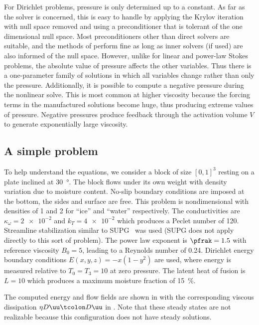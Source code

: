 For Dirichlet problems, pressure is only determined up to a constant.
As far as the solver is concerned, this is easy to handle by applying the Krylov iteration with null space removed and using a preconditioner that is tolerant of the one dimensional null space.
Most preconditioners other than direct solvers are suitable, and the methods of  perform fine as long as inner solvers (if used) are also informed of the null space.
However, unlike for linear and power-law Stokes problems, the absolute value of pressure affects the other variables.
Thus there is a one-parameter family of solutions in which all variables change rather than only the pressure.
Additionally, it is possible to compute a negative pressure during the nonlinear solve.
This is most common at higher viscosity because the forcing terms in the manufactured solutions become huge, thus producing extreme values of pressure.
Negative pressures produce feedback through the activation volume $V$ to generate exponentially large viscosity.

\subsection{A simple problem}\label{sec:vhtsimple}
To help understand the equations, we consider a block of size $[0,1]^3$ resting on a plate inclined at \SI{30}{\degree}.
The block flows under its own weight with density variation due to moisture content.
No-slip boundary conditions are imposed at the bottom, the sides and surface are free.
This problem is nondimensional with densities of 1 and 2 for ``ice'' and ``water'' respectively.
The conductivities are $\kappa_\omega = \num{2e-2}$ and $k_T = \num{4e-2}$ which produces a Peclet number of 120.
Streamline stabilization similar to SUPG~\citep{brooks1982sup} was used (SUPG does not apply directly to this sort of problem).
The power law exponent is $\pfrak=1.5$ with reference viscosity $B_0 = 5$, leading to a Reynolds number of \num{0.24}.
Dirichlet energy boundary conditions $E(x,y,z) = -x (1-y^2)$ are used, where energy is measured relative to $T_0 = T_3 = 10$ at zero pressure.
The latent heat of fusion is $L=10$ which produces a maximum moisture fraction of \SI{15}{\percent}.

The computed energy and flow fields are shown in  with the corresponding viscous dissipation $\eta D\uu\tcolon D\uu$ in .
Note that these steady states are not realizable because this configuration does not have steady solutions.

